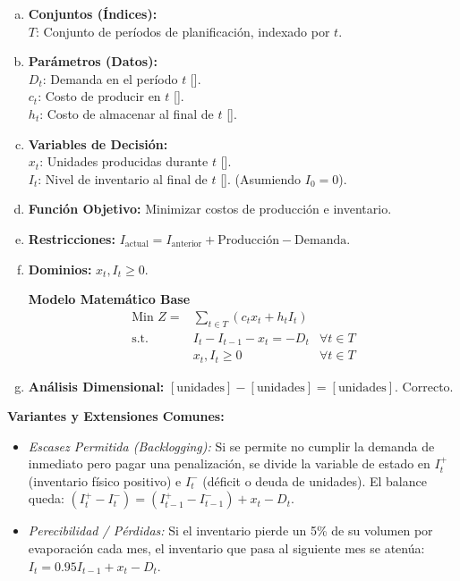 \documentclass{article}
\begin{document}
	\begin{enumerate}[a)]
		\item \textbf{Conjuntos (Índices):}\\
		$T$: Conjunto de períodos de planificación, indexado por $t$.
		
		\item \textbf{Parámetros (Datos):}\\
		$D_t$: Demanda en el período $t$ [].\\
		$c_t$: Costo de producir en $t$ [].\\
		$h_t$: Costo de almacenar al final de $t$ [].
		
		\item \textbf{Variables de Decisión:}\\
		$x_t$: Unidades producidas durante $t$ [].\\
		$I_t$: Nivel de inventario al final de $t$ []. (Asumiendo $I_0 = 0$).
		\item \textbf{Función Objetivo:} Minimizar costos de producción e inventario.
		\item \textbf{Restricciones:} $I_{\text{actual}} = I_{\text{anterior}} + \text{Producción} - \text{Demanda}$.
		\item \textbf{Dominios:} $x_t, I_t \geq 0$.
		
		\begin{center}
			\textbf{Modelo Matemático Base}
			$$\begin{aligned}
				\text{Min } Z = & \sum_{t \in T} (c_t x_t + h_t I_t) \\
				\text{s.t.} \quad & I_t - I_{t-1} - x_t = -D_t & \forall t \in T \\
				& x_t, I_t \geq 0 & \forall t \in T
			\end{aligned}$$
		\end{center}
		
		\item \textbf{Análisis Dimensional:} $[\text{unidades}] - [\text{unidades}] = [\text{unidades}]$. Correcto.
	\end{enumerate}
	
	\textbf{Variantes y Extensiones Comunes:}
	\begin{itemize}
		\item \textit{Escasez Permitida (Backlogging):} Si se permite no cumplir la demanda de inmediato pero pagar una penalización, se divide la variable de estado en $I_t^+$ (inventario físico positivo) e $I_t^-$ (déficit o deuda de unidades). El balance queda: $(I_t^+ - I_t^-) = (I_{t-1}^+ - I_{t-1}^-) + x_t - D_t$.
		\item \textit{Perecibilidad / Pérdidas:} Si el inventario pierde un 5\% de su volumen por evaporación cada mes, el inventario que pasa al siguiente mes se atenúa: $I_t = 0.95 I_{t-1} + x_t - D_t$.
	\end{itemize}
	
\end{document}
